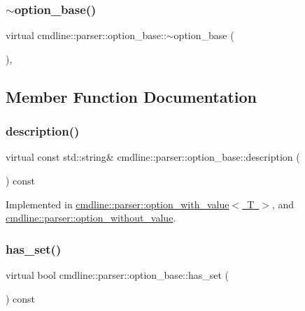 \subsubsection{\texorpdfstring{$\sim$option\_base()}{~option\_base()}}
{\footnotesize\ttfamily virtual cmdline\+::parser\+::option\+\_\+base\+::$\sim$option\+\_\+base (\begin{DoxyParamCaption}{ }\end{DoxyParamCaption})\hspace{0.3cm}{\ttfamily [inline]}, {\ttfamily [virtual]}}



\subsection{Member Function Documentation}
\mbox{\label{classcmdline_1_1parser_1_1option__base_adf2d7c92405305411ab6bc0d0b860d61}} 
\subsubsection{\texorpdfstring{description()}{description()}}
{\footnotesize\ttfamily virtual const std\+::string\& cmdline\+::parser\+::option\+\_\+base\+::description (\begin{DoxyParamCaption}{ }\end{DoxyParamCaption}) const\hspace{0.3cm}{\ttfamily [pure virtual]}}



Implemented in \mbox{\hyperlink{classcmdline_1_1parser_1_1option__with__value_ac430403324ef502009880473a5d4c945}{cmdline\+::parser\+::option\+\_\+with\+\_\+value$<$ T $>$}}, and \mbox{\hyperlink{classcmdline_1_1parser_1_1option__without__value_ad6912e60b2dc1157ba982d882292ab28}{cmdline\+::parser\+::option\+\_\+without\+\_\+value}}.

\mbox{\label{classcmdline_1_1parser_1_1option__base_aa948d89b57f4cd901bc20075ec277a04}} 
\subsubsection{\texorpdfstring{has\_set()}{has\_set()}}
{\footnotesize\ttfamily virtual bool cmdline\+::parser\+::option\+\_\+base\+::has\+\_\+set (\begin{DoxyParamCaption}{ }\end{DoxyParamCaption}) const\hspace{0.3cm}{\ttfamily [pure virtual]}}



